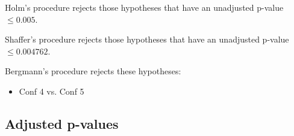 \documentclass[a4paper,10pt]{article}
\begin{document}
\begin{landscape}
Holm's procedure rejects those hypotheses that have an unadjusted p-value $\le0.005$.

Shaffer's procedure rejects those hypotheses that have an unadjusted p-value $\le0.004762$.

Bergmann's procedure rejects these hypotheses:

\begin{itemize}

\item Conf 4 vs. Conf 5

\end{itemize}

\pagebreak

\subsection{Adjusted p-values}


\end{landscape}
\end{document}
